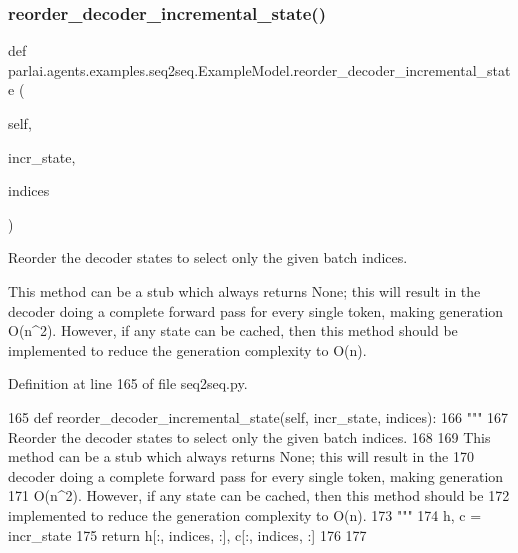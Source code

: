 \subsubsection{\texorpdfstring{reorder\+\_\+decoder\+\_\+incremental\+\_\+state()}{reorder\_decoder\_incremental\_state()}}
{\footnotesize\ttfamily def parlai.\+agents.\+examples.\+seq2seq.\+Example\+Model.\+reorder\+\_\+decoder\+\_\+incremental\+\_\+state (\begin{DoxyParamCaption}\item[{}]{self,  }\item[{}]{incr\+\_\+state,  }\item[{}]{indices }\end{DoxyParamCaption})}

\begin{DoxyVerb}Reorder the decoder states to select only the given batch indices.

This method can be a stub which always returns None; this will result in the
decoder doing a complete forward pass for every single token, making generation
O(n^2). However, if any state can be cached, then this method should be
implemented to reduce the generation complexity to O(n).
\end{DoxyVerb}
 

Definition at line 165 of file seq2seq.\+py.


\begin{DoxyCode}
165     \textcolor{keyword}{def }reorder\_decoder\_incremental\_state(self, incr\_state, indices):
166         \textcolor{stringliteral}{"""}
167 \textcolor{stringliteral}{        Reorder the decoder states to select only the given batch indices.}
168 \textcolor{stringliteral}{}
169 \textcolor{stringliteral}{        This method can be a stub which always returns None; this will result in the}
170 \textcolor{stringliteral}{        decoder doing a complete forward pass for every single token, making generation}
171 \textcolor{stringliteral}{        O(n^2). However, if any state can be cached, then this method should be}
172 \textcolor{stringliteral}{        implemented to reduce the generation complexity to O(n).}
173 \textcolor{stringliteral}{        """}
174         h, c = incr\_state
175         \textcolor{keywordflow}{return} h[:, indices, :], c[:, indices, :]
176 
177 
\end{DoxyCode}
\mbox{\label{classparlai_1_1agents_1_1examples_1_1seq2seq_1_1ExampleModel_adfb376efc6b36f7008281570a2a2ec9d}} 
